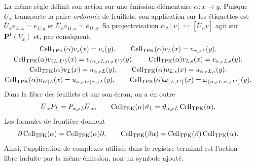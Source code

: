 La même règle définit son action sur une émission élémentaire \(\alpha:x\to y\). Puisque \(U_\alpha\) transporte la paire \emph{ordonnée} de feuillets, son application sur les étiquettes est \(\overline U_\alpha e_{\Sigma,x}=e_{\Sigma,y}\) et \(\overline U_\alpha e_{\Pi,x}=e_{\Pi,y}\). Sa projectivisation \(\alpha_{\mathscr I}[v]:=[\overline U_\alpha v]\) agit sur \(\mathbf P^1(V_x)\) et, par conséquent,
\begin{equation}
\label{eq:pdfv2-cor-cell-accion-emision}
 \begin{gathered}
 \operatorname{Cell}_{\rm TPK}(\alpha)v_\star(x)=v_\star(y),\qquad
 \operatorname{Cell}_{\rm TPK}(\alpha)v_L(x)
   =v_{\alpha_{\mathscr I}L}(y),\\
 \operatorname{Cell}_{\rm TPK}(\alpha)v_{\{L,L'\}}(x)
   =v_{\{\alpha_{\mathscr I}L,\alpha_{\mathscr I}L'\}}(y),\qquad
 \operatorname{Cell}_{\rm TPK}(\alpha)v_{L,\epsilon}(x)
   =v_{\alpha_{\mathscr I}L,\epsilon}(y),\\
 \operatorname{Cell}_{\rm TPK}(\alpha)u_L(x)
   =u_{\alpha_{\mathscr I}L}(y),\qquad
 \operatorname{Cell}_{\rm TPK}(\alpha)u_{L,\epsilon}(x)
   =u_{\alpha_{\mathscr I}L,\epsilon}(y),\\
 \operatorname{Cell}_{\rm TPK}(\alpha)u_{L'\mid L}(x)
   =u_{\alpha_{\mathscr I}L'\mid\alpha_{\mathscr I}L}(y),\qquad
 \operatorname{Cell}_{\rm TPK}(\alpha)\omega_{\{L,L'\}}(x)
   =\omega_{\{\alpha_{\mathscr I}L,
                 \alpha_{\mathscr I}L'\}}(y).
 \end{gathered}
\end{equation}
Dans la fibre des feuillets et sur son écran, on a en outre
\begin{equation}
\label{eq:pdfv2-cor-cell-entrelaza-proyectores-pantalla}
 \overline U_\alpha P_L=P_{\alpha_{\mathscr I}L}\overline U_\alpha,
 \qquad
 \operatorname{Cell}_{\rm TPK}(\alpha)\vartheta_L
 =\vartheta_{\alpha_{\mathscr I}L}
  \operatorname{Cell}_{\rm TPK}(\alpha).
\end{equation}
Les formules de frontière donnent
\begin{equation}
\label{eq:pdfv2-cor-cell-accion-emision-natural}
 \partial\operatorname{Cell}_{\rm TPK}(\alpha)
 =\operatorname{Cell}_{\rm TPK}(\alpha)\partial,\qquad
 \operatorname{Cell}_{\rm TPK}(\beta\alpha)
 =\operatorname{Cell}_{\rm TPK}(\beta)
  \operatorname{Cell}_{\rm TPK}(\alpha).
\end{equation}
Ainsi, l'application de complexes utilisée dans le registre terminal est l'action libre induite par la même émission, non un symbole ajouté.

